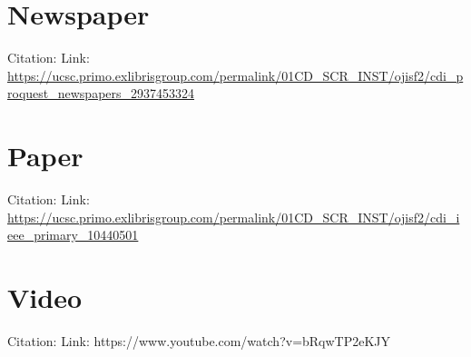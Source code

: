 \documentclass{article}
\begin{document}
\section{Newspaper}

Citation: \cite{thomas2024}
Link: \url{https://ucsc.primo.exlibrisgroup.com/permalink/01CD_SCR_INST/ojisf2/cdi_proquest_newspapers_2937453324}

\section{Paper}

Citation: \cite{ma2024}
Link: \url{https://ucsc.primo.exlibrisgroup.com/permalink/01CD_SCR_INST/ojisf2/cdi_ieee_primary_10440501}

\section{Video}

Citation: \cite{bloomberglaw2023}
Link: https://www.youtube.com/watch?v=bRqwTP2eKJY

\medskip

\printbibliography
\end{document}
